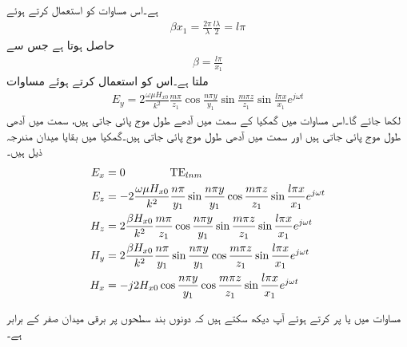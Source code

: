 ہے۔اس مساوات کو استعمال کرتے ہوئے
\begin{align*}
\beta x_1 = \frac{2\pi}{\lambda} \frac{l \lambda}{2}=l \pi
\end{align*}
حاصل ہوتا ہے جس سے
\begin{align}\label{مساوات_مویج_گمکی_زاویائی_مستقل}
\beta=\frac{l \pi}{x_1}
\end{align}
ملتا ہے۔اس کو استعمال کرتے ہوئے مساوات  
\begin{align}\label{مساوات_مویج_گمکی_برقی_ب}
E_y=2 \frac{\omega \mu H_{x0}}{k^2}\frac{m \pi}{z_1}\cos \frac{n\pi y}{y_1} \sin \frac{m \pi z}{z_1} \sin \frac{l \pi x}{x_1}  e^{j\omega t}
\end{align}
لکھا جائے گا۔اس مساوات میں گمکیا کے  سمت میں  آدھے طول موج پائی جاتی ہیں،  سمت میں  آدھی طول موج پائی جاتی ہیں اور  سمت میں  آدھی طول موج پائی جاتی ہیں۔گمکیا میں بقایا میدان مندرجہ ذیل ہیں۔
\begin{align}
E_x&=0 \quad \quad \quad \quad \textup{TE}_{lnm} \\
E_z&=-2 \frac{\omega \mu H_{x0}}{k^2}\frac{n \pi}{y_1}\sin \frac{n\pi y}{y_1} \cos \frac{m \pi z}{z_1} \sin \frac{l \pi x}{x_1}  e^{j\omega t}\label{مساوات_مویج_دوسرا_برقی_جزو}\\
H_z&=2 \frac{\beta   H_{x0}}{k^2}\frac{m \pi}{z_1}\cos \frac{n\pi y}{y_1} \sin \frac{m \pi z}{z_1} \sin \frac{l \pi x}{x_1}  e^{j\omega t}\label{مساوات_مویج_مقناطیسی_جزو_پ}\\
H_y&=2 \frac{\beta  H_{x0}}{k^2}\frac{n \pi}{y_1}\sin \frac{n\pi y}{y_1} \cos \frac{m \pi z}{z_1} \sin \frac{l \pi x}{x_1}  e^{j\omega t}\label{مساوات_مویج_مقناطیسی_جزو_ب}\\
H_x&=-j 2 H_{x0} \cos \frac{n\pi y}{y_1} \cos \frac{m \pi  z}{z_1} \sin \frac{l \pi x}{x_1} e^{j \omega t} \label{مساوات_مویج_مقناطیسی_جزو_الف}
\end{align}

مساوات  میں  یا  پر کرتے ہوئے آپ دیکھ سکتے ہیں کہ دونوں بند سطحوں پر برقی میدان صفر کے برابر ہے۔

